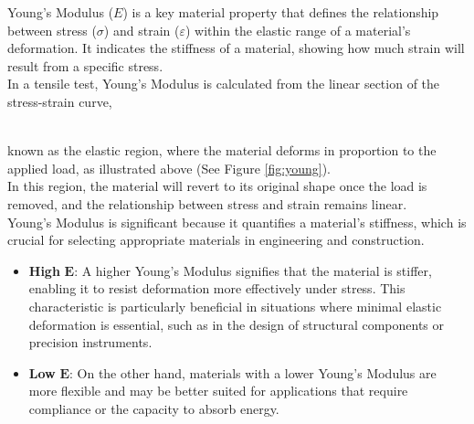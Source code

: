 \documentclass{article}
\begin{document}
{\begin{minipage}{\dimexpr\textwidth-0.55\textwidth\relax}
    Young's Modulus ($E$) is a key material property that defines the relationship between stress ($\sigma$) and strain ($\varepsilon$) within the elastic range of a material's deformation. It indicates the stiffness of a material, showing how much strain will result from a specific stress.\\[8pt]
    In a tensile test, Young's Modulus is calculated from the linear section of the stress-strain curve, 
\end{minipage}\\[3pt]
known as the elastic region, where the material deforms in proportion to the applied load, as illustrated above (See Figure \ref{fig:young}).\\[8pt]  
In this region, the material will revert to its original shape once the load is removed, and the relationship between stress and strain remains linear.\\[8pt] 
Young's Modulus is significant because it quantifies a material's stiffness, which is crucial for selecting appropriate materials in engineering and construction.
\begin{itemize}
    \item \textbf{High }\(\bm{E}\): A higher Young's Modulus signifies that the material is stiffer, enabling it to resist deformation more effectively under stress. This characteristic is particularly beneficial in situations where minimal elastic deformation is essential, such as in the design of structural components or precision instruments.
    \item \textbf{Low }\(\bm{E}\): On the other hand, materials with a lower Young's Modulus are more flexible and may be better suited for applications that require compliance or the capacity to absorb energy.
\end{itemize}
    \newpage

}
\end{document}
